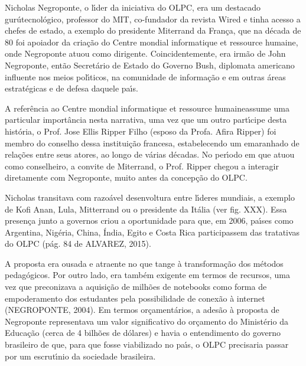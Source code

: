 \documentclass[
12pt,		%
openright,	%
twoside,  %
a4paper,			%
chapter=TITLE,		%
english,			%
french,				%
spanish,			%
brazil				%
]{USPSC-classe/USPSC}
\begin{document}
Nicholas Negroponte, o l\'{\i}der da iniciativa do OLPC, era um destacado \textquotedbl gur\'u\textquotedbl  tecnol\'ogico, professor do MIT, co-fundador da revista Wired e tinha acesso a chefes de estado, a exemplo do presidente Miterrand da Fran\c{c}a, que na d\'ecada de 80 foi apoiador da cria\c{c}\~ao do \textquotedbl Centre mondial informatique et ressource humaine\textquotedbl , onde Negroponte atuou como dirigente. Coincidentemente, era irm\~ao de John Negroponte, ent\~ao Secret\'ario de Estado do Governo Bush, diplomata americano influente nos meios pol\'{\i}ticos, na comunidade de informa\c{c}\~ao e em outras \'areas estrat\'egicas e de defesa daquele pa\'{\i}s.










A refer\^encia ao \textquotedbl Centre mondial informatique et ressource humaine\textquotedbl  assume uma particular import\^ancia nesta narrativa, uma vez que um outro part\'{\i}cipe desta hist\'oria, o Prof. Jose Ellis Ripper Filho (esposo da Profa. Afira Ripper) foi membro do conselho dessa institui\c{c}\~ao francesa, estabelecendo um emaranhado de rela\c{c}\~oes entre seus atores, ao longo de v\'arias d\'ecadas. No per\'{\i}odo em que atuou como conselheiro, a convite de Miterrand, o Prof. Ripper chegou a interagir diretamente com Negroponte, muito antes da concep\c{c}\~ao do OLPC.










Nicholas transitava com razo\'avel desenvoltura entre l\'{\i}deres mundiais, a exemplo de Kofi Anan, Lula, Mitterrand ou o presidente da It\'alia (ver fig. XXX). Essa presen\c{c}a junto a governos criou a oportunidade para que, em 2006, pa\'{\i}ses como Argentina, Nig\'eria, China, \'India, Egito e Costa Rica participassem das tratativas do OLPC  (p\'ag. 84 de ALVAREZ, 2015).










A proposta era ousada e atraente no que tange \`a transforma\c{c}\~ao dos m\'etodos pedag\'ogicos. Por outro lado, era tamb\'em exigente em termos de recursos, uma vez que preconizava a aquisi\c{c}\~ao de milh\~oes de notebooks como forma de empoderamento dos estudantes pela possibilidade de conex\~ao \`a internet  (NEGROPONTE, 2004). Em termos or\c{c}ament\'arios, a ades\~ao \`a proposta de Negroponte representava um valor significativo do or\c{c}amento do Minist\'erio da Educa\c{c}\~ao (cerca de 4 bilh\~oes de d\'olares) e havia o entendimento do governo brasileiro de que, para que fosse viabilizado no pa\'{\i}s, o OLPC precisaria passar por um escrut\'{\i}nio da sociedade brasileira.
\end{document}
